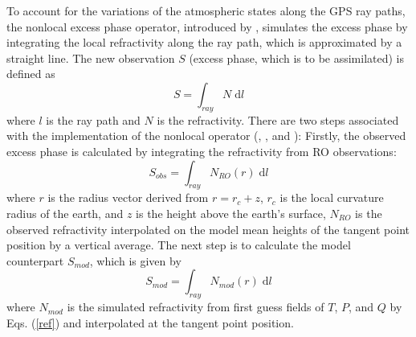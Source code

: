 \documentclass[12pt]{article}
\begin{document}
To account for the variations of the atmospheric states along the GPS ray paths, the nonlocal excess phase operator, introduced by \cite{Soko2005}, simulates the excess phase by integrating the local refractivity along the ray path, which is approximated by a straight line. The new observation $S$ (excess phase, which is to be assimilated) is defined as
 \begin{equation}
 \label{excess}
 S = \int_{ray} N\; \mathrm{d}l
  \end{equation}
  where $l$ is the ray path and $N$ is the refractivity. There are two steps associated with the implementation of the nonlocal operator (\cite{ChenSY2009}, \citet{Ma2009}, and \cite{Liu2008}): Firstly, the observed excess phase is calculated by integrating the refractivity from RO observations:
  \begin{equation}
  \label{excess-o}
  S_{obs} = \int_{ray} N_{RO}(r)\; \mathrm{d}l
  \end{equation}
  where $r$ is the radius vector derived from $r=r_c+z$, $r_c$ is the local curvature radius of the earth, and $z$ is the height above the earth's surface, $N_{RO}$ is the observed refractivity interpolated on the model mean heights of the tangent point position by a vertical average. The next step is to calculate the model counterpart $S_{mod}$, which is given by
 \begin{equation}
 \label{excess-m}
 S_{mod} = \int_{ray} N_{mod}(r)\; \mathrm{d}l
 \end{equation}
where  $N_{mod}$ is the simulated refractivity from first guess fields of $T$, $P$, and $Q$ by Eqs. (\ref{ref}) and interpolated at the tangent point position. 
\end{document}
